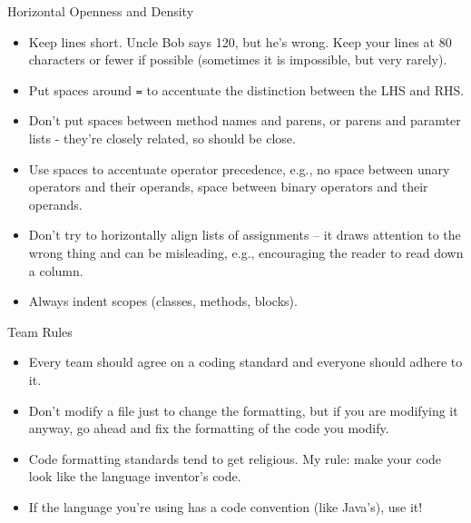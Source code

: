 \documentclass{beamer}
\begin{document}
\begin{frame}[fragile]{Horizontal Openness and Density}

\begin{itemize}
\item Keep lines short.  Uncle Bob says 120, but he's wrong.  Keep your lines at 80 characters or fewer if possible (sometimes it is impossible, but very rarely).
\item Put spaces around {\tt =} to accentuate the distinction between the LHS and RHS.
\item Don't put spaces between method names and parens, or parens and paramter lists - they're closely related, so should be close.
\item Use spaces to accentuate operator precedence, e.g., no space between unary operators and their operands, space between binary operators and their operands.
\item Don't try to horizontally align lists of assignments -- it draws attention to the wrong thing and can be misleading, e.g., encouraging the reader to read down a column.
\item Always indent scopes (classes, methods, blocks).
\end{itemize}


\end{frame}

\begin{frame}[fragile]{Team Rules}

\begin{itemize}
\item Every team should agree on a coding standard and everyone should adhere to it.
\item Don't modify a file just to change the formatting, but if you are modifying it anyway, go ahead and fix the formatting of the code you modify.
\item Code formatting standards tend to get religious.  My rule: make your code look like the language inventor's code.
\item If the language you're using has a code convention (like Java's), use it!
\end{itemize}


\end{frame}








\end{document}
